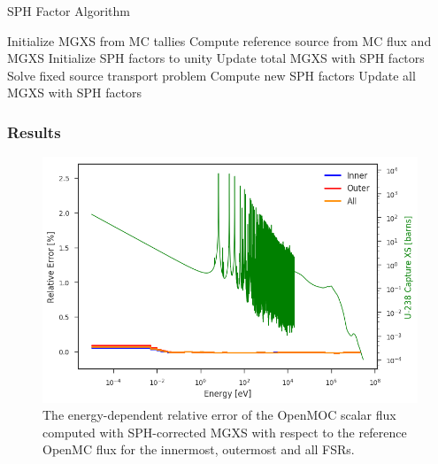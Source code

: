 \begin{algorithm}[h]
\caption{SPH Factor Algorithm}
\label{alg:sph}
\begin{algorithmic}[1]
  \State Initialize MGXS from MC tallies
  \State Compute reference source from MC flux and MGXS
  \State Initialize SPH factors to unity
    \State Update total MGXS with SPH factors
    \State Solve fixed source transport problem\footnotemark
    \State Compute new SPH factors
  \EndWhile
  \State Update all MGXS with SPH factors
\end{algorithmic}
\end{algorithm}



\subsubsection{Results}
\label{subsubsec:sph-results}

\begin{figure}[h!]
\centering
\includegraphics[width=\linewidth]{figures/rel-err-inner-outer-sph}
\caption{The energy-dependent relative error of the OpenMOC scalar flux computed with SPH-corrected MGXS with respect to the reference OpenMC flux for the innermost, outermost and all FSRs.}
\label{fig:rel-err-energy-sph}
\end{figure}

